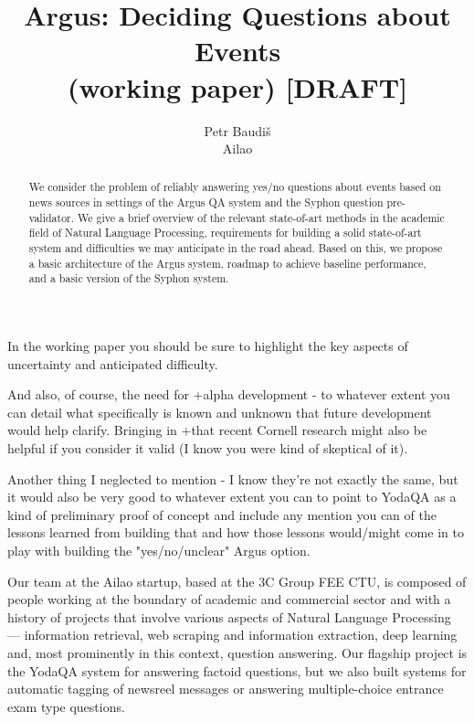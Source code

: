 \documentclass[11pt,a4paper]{article}
\title{Argus: Deciding Questions about Events \\ (working paper) [DRAFT]}
\author{Petr Baudiš \\ Ailao}
\begin{document}
\maketitle

\begin{abstract}%
	We consider the problem of reliably answering yes/no questions
	about events based on news sources in settings of the Argus QA
	system and the Syphon question pre-validator.
	We give a brief overview of the relevant state-of-art methods
	in the academic field of Natural Language Processing,
	requirements for building a solid state-of-art system
	and difficulties we may anticipate in the road ahead.
	Based on this, we propose a basic architecture of the Argus
	system, roadmap to achieve baseline performance, and a basic
	version of the Syphon system.
\end{abstract}

\vspace{3ex}

{\itshape

In the working paper you should be sure to highlight the key aspects of uncertainty and anticipated difficulty.
	
And also, of course, the need for +alpha development - to whatever extent you
can detail what specifically is known and unknown that future development would
help clarify. Bringing in +that recent Cornell research might also be helpful
if you consider it valid (I know you were kind of skeptical of it).

Another thing I neglected to mention - I know they're not exactly the same, but it would also be very good to whatever extent you can to
point to YodaQA as a kind of preliminary proof of concept and include any mention you can of the lessons learned from building that and how those
lessons would/might come in to play with building the "yes/no/unclear" Argus option.
}

Our team at the Ailao startup, based at the 3C Group FEE CTU,
is composed of people working at the boundary of academic and commercial
sector and with a history of projects that involve
various aspects of Natural Language Processing ---
information retrieval, web scraping and information extraction,
deep learning and, most prominently in this context, question answering.
Our flagship project is the YodaQA system for answering factoid questions,
but we also built systems for automatic tagging of newsreel messages
or answering multiple-choice entrance exam type questions.
\end{document}
